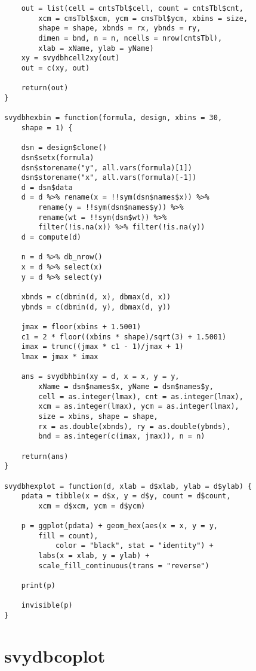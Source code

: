 \begin{lstlisting}
    out = list(cell = cntsTbl$cell, count = cntsTbl$cnt, 
        xcm = cmsTbl$xcm, ycm = cmsTbl$ycm, xbins = size, 
        shape = shape, xbnds = rx, ybnds = ry, 
        dimen = bnd, n = n, ncells = nrow(cntsTbl), 
        xlab = xName, ylab = yName)
    xy = svydbhcell2xy(out)
    out = c(xy, out)
    
    return(out)
}

svydbhexbin = function(formula, design, xbins = 30, 
    shape = 1) {
    
    dsn = design$clone()
    dsn$setx(formula)
    dsn$storename("y", all.vars(formula)[1])
    dsn$storename("x", all.vars(formula)[-1])
    d = dsn$data
    d = d %>% rename(x = !!sym(dsn$names$x)) %>% 
        rename(y = !!sym(dsn$names$y)) %>% 
        rename(wt = !!sym(dsn$wt)) %>% 
        filter(!is.na(x)) %>% filter(!is.na(y))
    d = compute(d)
    
    n = d %>% db_nrow()
    x = d %>% select(x)
    y = d %>% select(y)
    
    xbnds = c(dbmin(d, x), dbmax(d, x))
    ybnds = c(dbmin(d, y), dbmax(d, y))
    
    jmax = floor(xbins + 1.5001)
    c1 = 2 * floor((xbins * shape)/sqrt(3) + 1.5001)
    imax = trunc((jmax * c1 - 1)/jmax + 1)
    lmax = jmax * imax
    
    ans = svydbhbin(xy = d, x = x, y = y, 
        xName = dsn$names$x, yName = dsn$names$y, 
        cell = as.integer(lmax), cnt = as.integer(lmax), 
        xcm = as.integer(lmax), ycm = as.integer(lmax), 
        size = xbins, shape = shape, 
        rx = as.double(xbnds), ry = as.double(ybnds), 
        bnd = as.integer(c(imax, jmax)), n = n)
    
    return(ans)
}

svydbhexplot = function(d, xlab = d$xlab, ylab = d$ylab) {
    pdata = tibble(x = d$x, y = d$y, count = d$count, 
        xcm = d$xcm, ycm = d$ycm)
    
    p = ggplot(pdata) + geom_hex(aes(x = x, y = y, 
        fill = count), 
            color = "black", stat = "identity") + 
        labs(x = xlab, y = ylab) + 
        scale_fill_continuous(trans = "reverse")
    
    print(p)
    
    invisible(p)
}
\end{lstlisting}


\section{svydbcoplot}

